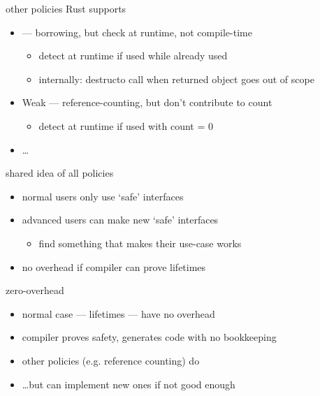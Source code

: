 \begin{frame}{other policies Rust supports}
    \begin{itemize}
        \item {} --- borrowing, but check at runtime, not compile-time
            \begin{itemize}
            \item detect at runtime if used while already used
            \item internally: destructo call when returned object goes out of scope
            \end{itemize}
        \item Weak --- reference-counting, but don't contribute to count
            \begin{itemize}
            \item detect at runtime if used with count = 0
            \end{itemize}
        \item \ldots
    \end{itemize}
\end{frame}

\begin{frame}{shared idea of all policies}
    \begin{itemize}
    \item normal users only use `safe' interfaces
    \item advanced users can make new `safe' interfaces
        \begin{itemize}
        \item find something that makes their use-case works
        \end{itemize}
    \item no overhead if compiler can prove lifetimes
    \end{itemize}
\end{frame}

\begin{frame}{zero-overhead}
    \begin{itemize}
    \item normal case --- lifetimes --- have no overhead
    \item compiler proves safety, generates code with no bookkeeping
        \vspace{.5cm}
    \item other policies (e.g. reference counting) do
    \item \ldots but can implement new ones if not good enough
    \end{itemize}
\end{frame}

